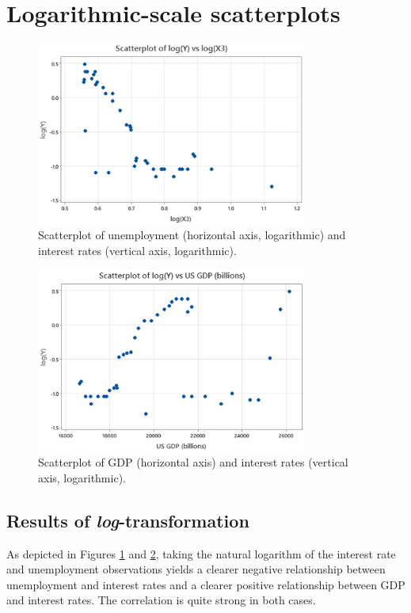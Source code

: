 \documentclass[12pt]{article}
\begin{document}
\section{Logarithmic-scale scatterplots}
\label{sec:logtransformations}
\begin{figure}
\begin{center}
\includegraphics[width=3.5in]{images/log-unemployment-log-scatterplot.png}
\end{center}
\caption{Scatterplot of unemployment (horizontal axis, logarithmic) and interest rates (vertical axis, logarithmic).\label{fig:logunemploymentlogscatterplot}}
\end{figure}
\begin{figure}
\begin{center}
\includegraphics[width=3.5in]{images/gdp-log-scatterplot.png}
\end{center}
\caption{Scatterplot of GDP (horizontal axis) and interest rates (vertical axis, logarithmic).\label{fig:gdplogscatterplot}}
\end{figure}
\subsection{Results of \textit{log}-transformation}
As depicted in Figures \ref{fig:logunemploymentlogscatterplot} and \ref{fig:gdplogscatterplot}, taking the natural logarithm of the interest rate and unemployment observations yields a clearer negative relationship between unemployment and interest rates and a clearer positive relationship between GDP and interest rates. The correlation is quite strong in both cases.
\end{document}
